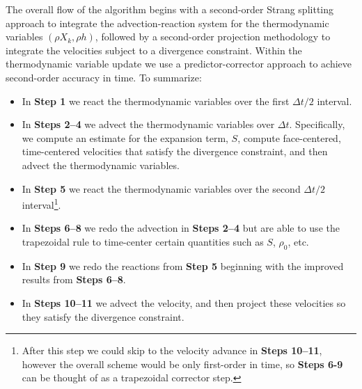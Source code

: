 The overall flow of the algorithm begins with a second-order Strang splitting approach to integrate the advection-reaction system for 
the thermodynamic variables $(\rho X_k, \rho h)$, followed by a second-order projection methodology to integrate the velocities subject to a divergence constraint.  Within the thermodynamic variable update we use a predictor-corrector approach to achieve second-order accuracy in time.
To summarize:
\begin{itemize}
\item In {\bf Step 1} we react the thermodynamic variables over the first $\Delta t/2$ interval.
\item In {\bf Steps 2--4} we advect the thermodynamic variables over $\Delta t$.  Specifically, we compute an estimate for the expansion term, $S$, compute face-centered, time-centered velocities that satisfy the divergence constraint, and then advect the thermodynamic variables.
\item In {\bf Step 5} we react the thermodynamic variables over the second $\Delta t/2$ interval\footnote{After this step we could skip to the velocity advance in {\bf Steps 10--11}, however the overall scheme would be only first-order in time, so {\bf Steps 6-9} can be thought of as a trapezoidal corrector step.}.
\item In {\bf Steps 6--8} we redo the advection in {\bf Steps 2--4} but are able to use the trapezoidal rule to time-center certain quantities such as $S$, $\rho_0$, etc.
\item In {\bf Step 9} we redo the reactions from {\bf Step 5} beginning with the improved results from {\bf Steps 6--8}.
\item In {\bf Steps 10--11} we advect the velocity, and then project these velocities so they satisfy the divergence constraint.
\end{itemize}

